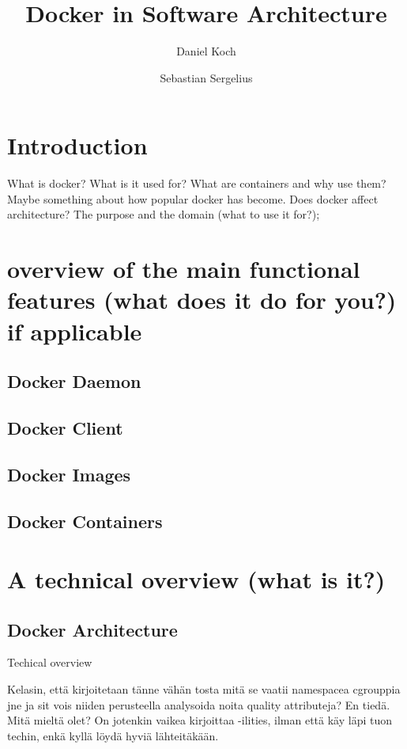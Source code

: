 \documentclass[fleqn,12pt]{olplainarticle}
\title{Docker in Software Architecture}
\author[1]{Daniel Koch}
\author[2]{Sebastian Sergelius}
\affil[1]{Address of first author}
\affil[2]{github.com/sebazai}
\begin{document}
\flushbottom
\maketitle
\thispagestyle{empty}

\section*{Introduction}

What is docker? What is it used for? What are containers and why use them? Maybe something about how popular docker has become. Does docker affect architecture?
The purpose and the domain (what to use it for?);

\section*{overview of the main functional features (what does it do for you?) if applicable}

\subsection*{Docker Daemon}

\subsection*{Docker Client}

\subsection*{Docker Images}

\subsection*{Docker Containers}


\section*{A technical overview (what is it?)}

\subsection*{Docker Architecture}
Techical overview

Kelasin, että kirjoitetaan tänne vähän tosta mitä se vaatii namespacea cgrouppia jne ja sit vois niiden perusteella analysoida noita quality attributeja? En tiedä. Mitä mieltä olet? On jotenkin vaikea kirjoittaa -ilities, ilman että käy läpi tuon techin, enkä kyllä löydä hyviä lähteitäkään. 
\end{document}
